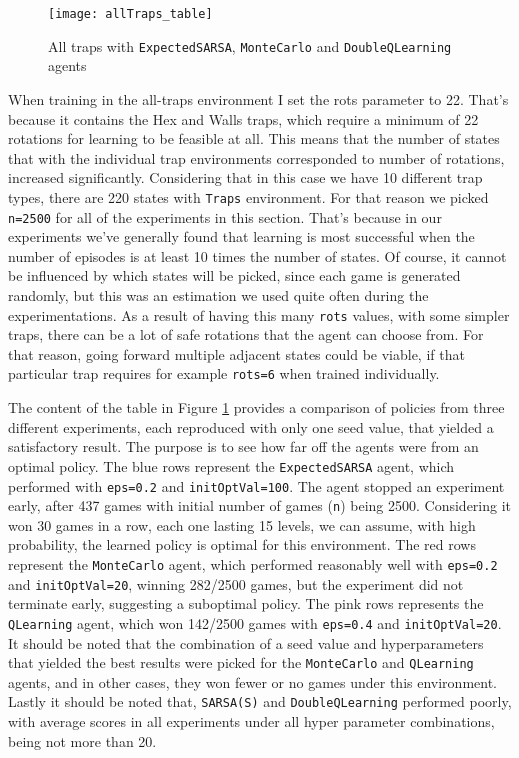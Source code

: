 \begin{figure}[h]
    \centering
    \texttt{[image: allTraps\_table]}
    \caption{All traps with \texttt{ExpectedSARSA}, \texttt{MonteCarlo} and \texttt{DoubleQLearning} agents}
    \label{fig:traps_table_eg}
\end{figure}

When training in the all-traps environment I set the rots parameter to 22.  That's because it contains the Hex and Walls traps, which require a minimum of 22 rotations for learning to be feasible at all. This means that the number of states that with the individual trap environments corresponded to number of rotations, increased significantly. Considering that in this case we have 10 different trap types, there are 220 states with \texttt{Traps} environment. For that reason we picked \texttt{n=2500} for all of the experiments in this section. That's because in our experiments we've generally found that learning is most successful when the number of episodes is at least 10 times the number of states. Of course, it cannot be influenced by which states will be picked, since each game is generated randomly, but this was an estimation we used quite often during the experimentations. As a result of having this many \texttt{rots} values, with some simpler traps, there can be a lot of safe rotations that the agent can choose from. For that reason, going forward multiple adjacent states could be viable, if that particular trap requires for example \texttt{rots=6} when trained individually.

The content of the table in Figure \ref{fig:traps_table_eg} provides a comparison of policies from three different experiments, each reproduced with only one seed value, that yielded a satisfactory result. The purpose is to see how far off the agents were from an optimal policy. The blue rows represent the \texttt{ExpectedSARSA} agent, which performed with \texttt{eps=0.2} and \texttt{initOptVal=100}. The agent stopped an experiment early, after 437 games with initial number of games (\texttt{n}) being 2500. Considering it won 30 games in a row, each one lasting 15 levels, we can assume, with high probability, the learned policy is optimal for this environment. The red rows represent the \texttt{MonteCarlo} agent, which performed reasonably well with \texttt{eps=0.2} and \texttt{initOptVal=20}, winning 282/2500 games, but the experiment did not terminate early, suggesting a suboptimal policy. The pink rows represents the \texttt{QLearning} agent, which won 142/2500 games with \texttt{eps=0.4} and \texttt{initOptVal=20}. It should be noted that the combination of a seed value and hyperparameters that yielded the best results were picked for the \texttt{MonteCarlo} and \texttt{QLearning} agents, and in other cases, they won fewer or no games under this environment. Lastly it should be noted that, \texttt{SARSA(S)} and \texttt{DoubleQLearning}  performed poorly, with average scores in all experiments under all hyper parameter combinations, being not more than 20.

